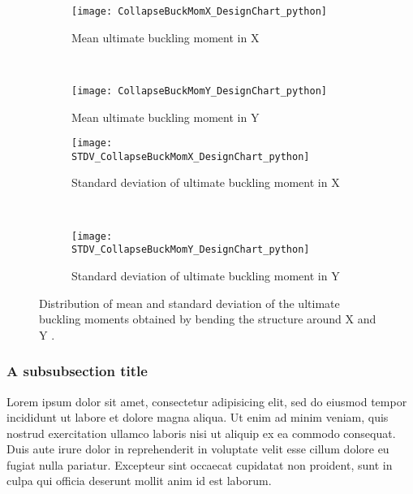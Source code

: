 \begin{figure}[htb]
	\centering
	\begin{subfigure}[b]{0.485\textwidth}
		\texttt{[image: CollapseBuckMomX\_DesignChart\_python]}
		\caption{Mean ultimate buckling moment in X}
		\label{fig:ultimate_Mom_design_charts_MeanX}
	\end{subfigure}
	~ %
	\begin{subfigure}[b]{0.485\textwidth}
		\texttt{[image: CollapseBuckMomY\_DesignChart\_python]}
		\caption{Mean ultimate buckling moment in Y}
		\label{fig:ultimate_Mom_design_charts_MeanY}
	\end{subfigure}
	
	\begin{subfigure}[b]{0.48\textwidth}
		\texttt{[image: STDV\_CollapseBuckMomX\_DesignChart\_python]}
		\caption{Standard deviation of ultimate buckling moment in X}
		\label{fig:ultimate_Mom_design_charts_SD_X}
	\end{subfigure}
	~ %
	\begin{subfigure}[b]{0.48\textwidth}
		\texttt{[image: STDV\_CollapseBuckMomY\_DesignChart\_python]}
		\caption{Standard deviation of ultimate buckling moment in Y}
		\label{fig:ultimate_Mom_design_charts_SD_Y}
	\end{subfigure}
	\caption[Ultimate buckling moments]{%
		Distribution of mean and standard deviation of the ultimate
		buckling moments obtained by bending the structure around X and Y \cite{bessa2018a}.
	}
	\label{fig:ultimate_Mom_design_charts}
\end{figure} 

\subsubsection{A subsubsection title}

Lorem ipsum dolor sit amet, consectetur adipisicing elit, sed do eiusmod tempor incididunt ut labore et dolore magna aliqua. Ut enim ad minim veniam, quis nostrud exercitation ullamco laboris nisi ut aliquip ex ea commodo consequat. Duis aute irure dolor in reprehenderit in voluptate velit esse cillum dolore eu fugiat nulla pariatur. Excepteur sint occaecat cupidatat non proident, sunt in culpa qui officia deserunt mollit anim id est laborum.


